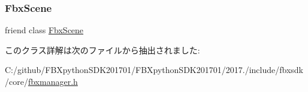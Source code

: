 \subsubsection{\texorpdfstring{Fbx\+Scene}{FbxScene}}
{\footnotesize\ttfamily friend class \hyperlink{class_fbx_scene}{Fbx\+Scene}\hspace{0.3cm}{\ttfamily [friend]}}



このクラス詳解は次のファイルから抽出されました\+:\begin{DoxyCompactItemize}
\item 
C\+:/github/\+F\+B\+Xpython\+S\+D\+K201701/\+F\+B\+Xpython\+S\+D\+K201701/2017./include/fbxsdk/core/\hyperlink{fbxmanager_8h}{fbxmanager.\+h}\end{DoxyCompactItemize}
